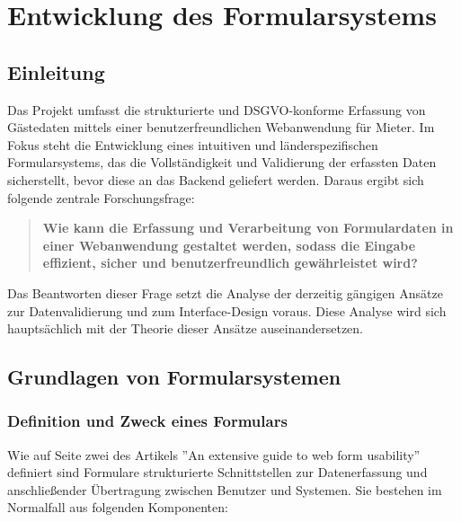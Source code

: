  \section{Entwicklung des Formularsystems}

\subsection{Einleitung}

Das Projekt umfasst die strukturierte und DSGVO-konforme Erfassung von Gästedaten mittels einer benutzerfreundlichen Webanwendung für Mieter. Im Fokus steht die Entwicklung eines intuitiven und länderspezifischen Formularsystems, das die Vollständigkeit und Validierung der erfassten Daten sicherstellt, bevor diese an das Backend geliefert werden.
Daraus ergibt sich folgende zentrale Forschungsfrage:

\begin{quote}
\textbf{Wie kann die Erfassung und Verarbeitung von Formulardaten in einer Webanwendung gestaltet werden, sodass die Eingabe effizient, sicher und benutzerfreundlich gewährleistet wird?}
\end{quote}

Das Beantworten dieser Frage setzt die Analyse der derzeitig gängigen Ansätze zur Datenvalidierung und zum Interface-Design voraus. Diese Analyse wird sich hauptsächlich mit der Theorie dieser Ansätze auseinandersetzen.

\subsection{Grundlagen von Formularsystemen}
\subsubsection{Definition und Zweck eines Formulars}
Wie auf Seite zwei des Artikels ''An extensive guide to web form usability'' \cite{mifsud2011extensive} definiert sind Formulare strukturierte Schnittstellen zur Datenerfassung und anschließender Übertragung zwischen Benutzer und Systemen. Sie bestehen im Normalfall aus folgenden Komponenten: \cite{prompt2_pollak}

